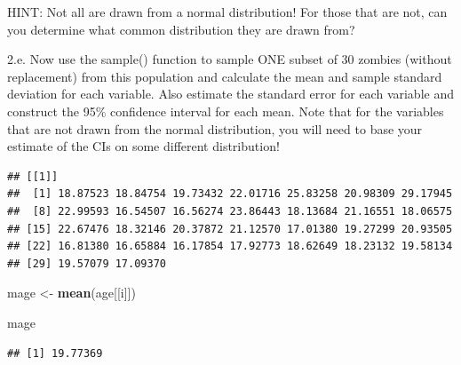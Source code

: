 \documentclass[]{article}
\newenvironment{Shaded}{\begin{snugshade}}{\end{snugshade}}
\newcommand{\KeywordTok}[1]{\textcolor[rgb]{0.13,0.29,0.53}{\textbf{#1}}}
\newcommand{\DataTypeTok}[1]{\textcolor[rgb]{0.13,0.29,0.53}{#1}}
\newcommand{\DecValTok}[1]{\textcolor[rgb]{0.00,0.00,0.81}{#1}}
\newcommand{\StringTok}[1]{\textcolor[rgb]{0.31,0.60,0.02}{#1}}
\newcommand{\CommentTok}[1]{\textcolor[rgb]{0.56,0.35,0.01}{\textit{#1}}}
\newcommand{\OtherTok}[1]{\textcolor[rgb]{0.56,0.35,0.01}{#1}}
\newcommand{\ControlFlowTok}[1]{\textcolor[rgb]{0.13,0.29,0.53}{\textbf{#1}}}
\newcommand{\OperatorTok}[1]{\textcolor[rgb]{0.81,0.36,0.00}{\textbf{#1}}}
\newcommand{\NormalTok}[1]{#1}
\begin{document}
HINT: Not all are drawn from a normal distribution! For those that are
not, can you determine what common distribution they are drawn from?

2.e. Now use the sample() function to sample ONE subset of 30 zombies
(without replacement) from this population and calculate the mean and
sample standard deviation for each variable. Also estimate the standard
error for each variable and construct the 95\% confidence interval for
each mean. Note that for the variables that are not drawn from the
normal distribution, you will need to base your estimate of the CIs on
some different distribution!

\begin{Shaded}
\end{Shaded}

\begin{verbatim}
## [[1]]
##  [1] 18.87523 18.84754 19.73432 22.01716 25.83258 20.98309 29.17945
##  [8] 22.99593 16.54507 16.56274 23.86443 18.13684 21.16551 18.06575
## [15] 22.67476 18.32146 20.37872 21.12570 17.01380 19.27299 20.93505
## [22] 16.81380 16.65884 16.17854 17.92773 18.62649 18.23132 19.58134
## [29] 19.57079 17.09370
\end{verbatim}

\begin{Shaded}
\begin{Highlighting}[]
\NormalTok{mage <-}\StringTok{ }\KeywordTok{mean}\NormalTok{(age[[i]])}

\NormalTok{mage}
\end{Highlighting}
\end{Shaded}

\begin{verbatim}
## [1] 19.77369
\end{verbatim}
\end{document}
